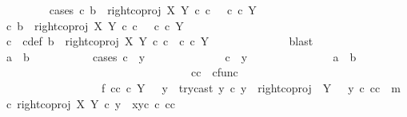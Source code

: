 \begin{isabellebody}
\ \ \ \ \ \ \ \ \isamarkupfalse%
{\isacharparenleft}{\kern0pt}cases\ {\isachardoublequoteopen}{\isasymexists}c{\isachardot}{\kern0pt}\ b\ {\isacharequal}{\kern0pt}\ right{\isacharunderscore}{\kern0pt}coproj\ X\ Y\ {\isasymcirc}\isactrlsub c\ c\ \ {\isasymand}\ c\ {\isasymin}\isactrlsub c\ Y{\isachardoublequoteclose}{\isacharparenright}{\kern0pt}\isanewline
\ \ \ \ \ \ \ \ \ \ \isamarkupfalse%
\ {\isachardoublequoteopen}{\isasymexists}c{\isachardot}{\kern0pt}\ b\ {\isacharequal}{\kern0pt}\ right{\isacharunderscore}{\kern0pt}coproj\ X\ Y\ {\isasymcirc}\isactrlsub c\ c\ \ {\isasymand}\ c\ {\isasymin}\isactrlsub c\ Y{\isachardoublequoteclose}\isanewline
\ \ \ \ \ \ \ \ \ \ \isamarkupfalse%
\ \isamarkupfalse%
\ c\ \ c{\isacharunderscore}{\kern0pt}def{\isacharcolon}{\kern0pt}\ {\isachardoublequoteopen}b\ {\isacharequal}{\kern0pt}\ right{\isacharunderscore}{\kern0pt}coproj\ X\ Y\ {\isasymcirc}\isactrlsub c\ c\ {\isasymand}\ c\ {\isasymin}\isactrlsub c\ Y{\isachardoublequoteclose}\isanewline
\ \ \ \ \ \ \ \ \ \ \ \ \isamarkupfalse%
\ blast\ \ \isanewline
\ \ \ \ \ \ \ \ \ \ \isamarkupfalse%
\ {\isachardoublequoteopen}a\ {\isacharequal}{\kern0pt}\ b{\isachardoublequoteclose}\isanewline
\ \ \ \ \ \ \ \ \ \ \isamarkupfalse%
{\isacharparenleft}{\kern0pt}cases\ {\isachardoublequoteopen}c\ {\isacharequal}{\kern0pt}\ y{}{\isachardoublequoteclose}{\isacharparenright}{\kern0pt}\isanewline
\ \ \ \ \ \ \ \ \ \ \ \ \isamarkupfalse%
\ {\isachardoublequoteopen}c\ {\isacharequal}{\kern0pt}\ y{}{\isachardoublequoteclose}\ \isanewline
\ \ \ \ \ \ \ \ \ \ \ \ \isamarkupfalse%
\ {\isachardoublequoteopen}a\ {\isacharequal}{\kern0pt}\ b{\isachardoublequoteclose}\isanewline
\ \ \ \ \ \ \ \ \ \ \ \ \ \ \isamarkupfalse%
\ {\isacharminus}{\kern0pt}\isanewline
\ \ \ \ \ \ \ \ \ \ \ \ \ \ \ \ \isamarkupfalse%
\ cc\ {\isacharcolon}{\kern0pt}{\isacharcolon}{\kern0pt}\ cfunc\ \isanewline
\ \ \ \ \ \ \ \ \ \ \ \ \ \ \ \ \ \ f{}{\isacharcolon}{\kern0pt}\ {\isachardoublequoteopen}cc\ {\isasymin}\isactrlsub c\ Y\ {\isasymsetminus}\ {\isacharparenleft}{\kern0pt}{\isasymone}{\isacharcomma}{\kern0pt}\ y{}{\isacharparenright}{\kern0pt}\ {\isasymand}\ try{\isacharunderscore}{\kern0pt}cast\ y{}\ {\isasymcirc}\isactrlsub c\ y\ {\isacharequal}{\kern0pt}\ right{\isacharunderscore}{\kern0pt}coproj\ {\isasymone}\ {\isacharparenleft}{\kern0pt}Y\ {\isasymsetminus}\ {\isacharparenleft}{\kern0pt}{\isasymone}{\isacharcomma}{\kern0pt}\ y{}{\isacharparenright}{\kern0pt}{\isacharparenright}{\kern0pt}\ {\isasymcirc}\isactrlsub c\ cc\ {\isasymand}\ m\ {\isasymcirc}\isactrlsub c\ right{\isacharunderscore}{\kern0pt}coproj\ X\ Y\ {\isasymcirc}\isactrlsub c\ y\ {\isacharequal}{\kern0pt}\ {\isasymlangle}x{}{\isacharcomma}{\kern0pt}y{}\isactrlsup c\ {\isasymcirc}\isactrlsub c\ cc{\isasymrangle}{\isachardoublequoteclose}\isanewline

\end{isabellebody}
